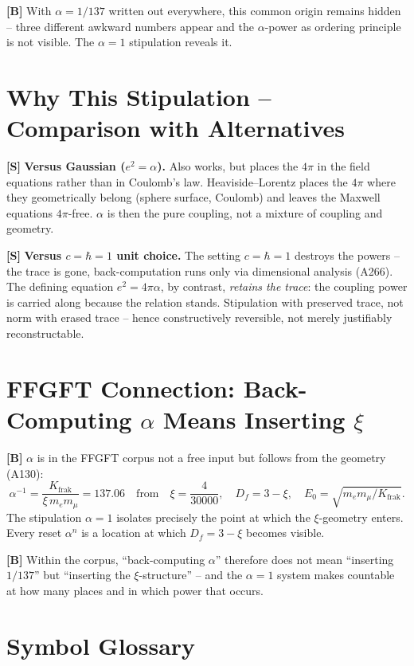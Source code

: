 \textbf{[B]} With $\alpha=1/137$ written out everywhere, this common origin
remains hidden -- three different awkward numbers appear and the $\alpha$-power
as ordering principle is not visible. The $\alpha=1$ stipulation reveals it.

\section{Why This Stipulation -- Comparison with Alternatives}

\textbf{[S]} \textbf{Versus Gaussian ($e^2=\alpha$).} Also works, but places the
$4\pi$ in the field equations rather than in Coulomb's law. Heaviside--Lorentz
places the $4\pi$ where they geometrically belong (sphere surface, Coulomb) and
leaves the Maxwell equations $4\pi$-free. $\alpha$ is then the pure coupling, not
a mixture of coupling and geometry.

\textbf{[S]} \textbf{Versus $c=\hbar=1$ unit choice.} The setting $c=\hbar=1$
destroys the powers -- the trace is gone, back-computation runs only via
dimensional analysis (A266). The defining equation $e^2=4\pi\alpha$, by contrast,
\emph{retains the trace}: the coupling power is carried along because the relation
stands. Stipulation with preserved trace, not norm with erased trace -- hence
constructively reversible, not merely justifiably reconstructable.

\section{FFGFT Connection: Back-Computing $\alpha$ Means Inserting $\xi$}

\textbf{[B]} $\alpha$ is in the FFGFT corpus not a free input but follows from
the geometry (A130):
\[
  \alpha^{-1} = \frac{K_\text{frak}}{\xi\,m_em_\mu} = 137{.}06 \quad\text{from}\quad \xi = \frac{4}{30000},
  \quad D_f = 3-\xi, \quad E_0=\sqrt{m_em_\mu/K_\text{frak}}.
\]
The stipulation $\alpha=1$ isolates precisely the point at which the $\xi$-geometry
enters. Every reset $\alpha^n$ is a location at which $D_f=3-\xi$ becomes visible.

\textbf{[B]} Within the corpus, ``back-computing $\alpha$'' therefore does not
mean ``inserting $1/137$'' but ``inserting the $\xi$-structure'' -- and the
$\alpha{=}1$ system makes countable at how many places and in which power that
occurs.

\section{Symbol Glossary}

